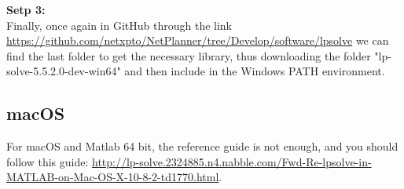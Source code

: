 \textbf{Setp 3:}\\
Finally, once again in GitHub through the link \url{https://github.com/netxpto/NetPlanner/tree/Develop/software/lpsolve} we can find the last folder to get the necessary library, thus downloading the folder "lp-solve-5.5.2.0-dev-win64" and then include in the Windows PATH environment. \\

\subsection{macOS}\label{macOS}

\vspace{11pt}
For macOS  and Matlab 64 bit, the reference guide is not enough, and you should follow this guide: \url{http://lp-solve.2324885.n4.nabble.com/Fwd-Re-lpsolve-in-MATLAB-on-Mac-OS-X-10-8-2-td1770.html}.

